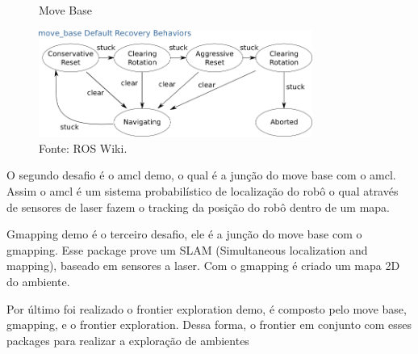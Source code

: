 
\begin{figure} [h!]
    \centering
    \caption{Move Base}
    \includegraphics[width=0.8\textwidth]{Figures/recovery_behaviors.png}
    \caption*{Fonte: ROS Wiki.}
    \label{fig:Move Base}
\end{figure}

O segundo desafio é o amcl demo, o qual é a junção do move base com o
amcl. Assim o amcl é um sistema probabilístico de localização do robô
o qual através de sensores de laser fazem o tracking da posição do 
robô dentro de um mapa.



Gmapping demo é o terceiro desafio, ele é a junção do move base com o
gmapping. Esse package prove um SLAM (Simultaneous localization and mapping), 
baseado em sensores a laser. Com o gmapping é criado um mapa 2D do ambiente.



Por último foi realizado o frontier exploration demo, é composto 
pelo move base, gmapping, e o frontier exploration. Dessa forma,
o frontier em conjunto com esses packages para realizar a 
exploração de ambientes


